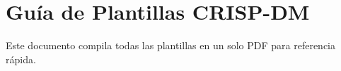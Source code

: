 \documentclass[11pt]{article}
\begin{document}
\tableofcontents
\newpage
\section*{Gu\'ia de Plantillas CRISP-DM}
Este documento compila todas las plantillas en un solo PDF para referencia r\'apida.
\newpage

\newpage
\newpage
\newpage
\newpage
\newpage
\newpage
\newpage
\newpage
\newpage
\newpage
\newpage
\newpage
\newpage
\newpage
\newpage
\newpage
\newpage
\newpage
\end{document}

